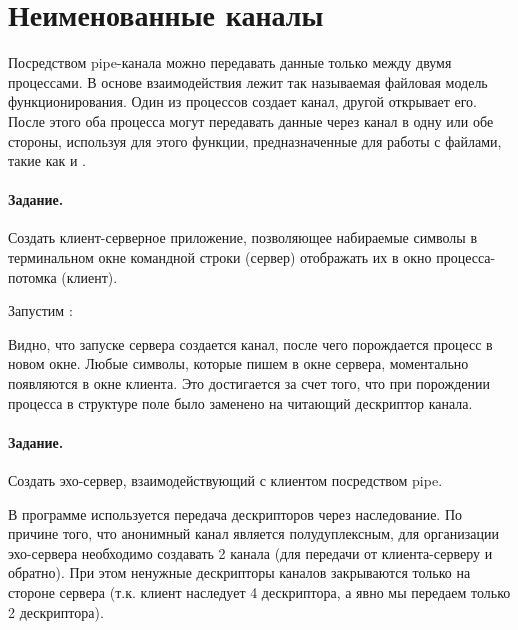 

\section{Неименованные каналы}

Посредством pipe-канала можно передавать данные только между двумя процессами. В основе взаимодействия лежит так называемая файловая модель функционирования. Один из процессов создает канал, другой открывает его. После этого оба процесса могут передавать данные через канал в одну или обе стороны, используя для этого функции, предназначенные для работы с файлами, такие как  и .

\paragraph{Задание.} Создать клиент-серверное приложение, позволяющее набираемые символы в терминальном окне командной строки (сервер) отображать их в окно процесса-потомка (клиент).





\newpage

Запустим :





Видно, что запуске сервера создается канал, после чего порождается процесс  в новом окне. Любые символы, которые пишем в окне сервера, моментально появляются в окне клиента. Это достигается за счет того, что при порождении процесса в структуре  поле  было заменено на читающий дескриптор канала.

\paragraph{Задание.} Создать эхо-сервер, взаимодействующий с клиентом посредством pipe.

В программе используется передача дескрипторов через наследование. По причине того, что анонимный канал является полудуплексным, для организации эхо-сервера необходимо создавать 2 канала (для передачи от клиента-серверу и обратно). При этом ненужные дескрипторы каналов закрываются только на стороне сервера (т.к. клиент наследует 4 дескриптора, а явно мы передаем только 2 дескриптора).


